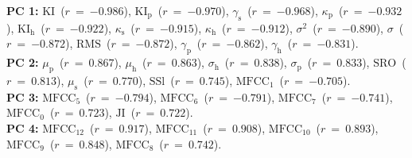 {\bf{PC 1:}} $\textrm{KI}$~($r~=~{-0.986}$), $\textrm{KI}_{\textrm{p}}$~($r~=~{-0.970}$), $\gamma_{\textrm{s}}$~($r~=~{-0.968}$), $\kappa_{\textrm{p}}$~($r~=~{-0.932}$), $\textrm{KI}_{\textrm{h}}$~($r~=~{-0.922}$), $\kappa_{\textrm{s}}$~($r~=~{-0.915}$), $\kappa_{\textrm{h}}$~($r~=~{-0.912}$), $\sigma^{2}$~($r~=~{-0.890}$), $\sigma$~($r~=~{-0.872}$), $\textrm{RMS}$~($r~=~{-0.872}$), $\gamma_{\textrm{p}}$~($r~=~{-0.862}$), $\gamma_{\textrm{h}}$~($r~=~{-0.831}$).\vspace{0.5em}\\
{\bf{PC 2:}} $\mu_{\textrm{p}}$~($r~=~{ 0.867}$), $\mu_{\textrm{h}}$~($r~=~{ 0.863}$), $\sigma_{\textrm{h}}$~($r~=~{ 0.838}$), $\sigma_{\textrm{p}}$~($r~=~{ 0.833}$), $\textrm{SRO}$~($r~=~{ 0.813}$), $\mu_{\textrm{s}}$~($r~=~{ 0.770}$), $\textrm{SSl}$~($r~=~{ 0.745}$), $\textrm{MFCC}_{1}$~($r~=~{-0.705}$).\vspace{0.5em}\\
{\bf{PC 3:}} $\textrm{MFCC}_{5}$~($r~=~{-0.794}$), $\textrm{MFCC}_{6}$~($r~=~{-0.791}$), $\textrm{MFCC}_{7}$~($r~=~{-0.741}$), $\textrm{MFCC}_{0}$~($r~=~{ 0.723}$), $\textrm{JI}$~($r~=~{ 0.722}$).\vspace{0.5em}\\
{\bf{PC 4:}} $\textrm{MFCC}_{12}$~($r~=~{0.917}$), $\textrm{MFCC}_{11}$~($r~=~{0.908}$), $\textrm{MFCC}_{10}$~($r~=~{0.893}$), $\textrm{MFCC}_{9}$~($r~=~{0.848}$), $\textrm{MFCC}_{8}$~($r~=~{0.742}$).
